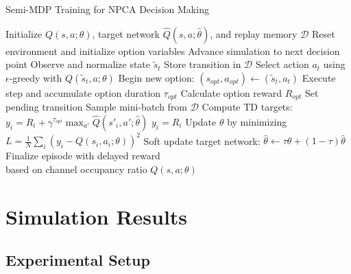 \documentclass[conference]{IEEEtran}
\begin{document}
\begin{algorithm}[htbp]
\caption{Semi-MDP Training for NPCA Decision Making}
\label{alg:semi_mdp_npca}
\begin{algorithmic}[1]
\STATE Initialize $Q(s,a;\theta)$, target network $\hat{Q}(s,a;\hat{\theta})$, and replay memory $\mathcal{D}$
    \STATE Reset environment and initialize option variables
        \STATE Advance simulation to next decision point
            \STATE Observe and normalize state $\tilde{s}_t$ 
                \STATE Store transition in $\mathcal{D}$
            \ENDIF
            \STATE Select action $a_t$ using $\epsilon$-greedy with $Q(\tilde{s}_t, a; \theta)$
            \STATE Begin new option: $(s_{opt}, a_{opt}) \leftarrow (\tilde{s}_t, a_t)$
        \ENDIF
        \STATE Execute step and accumulate option duration $\tau_{opt}$
            \STATE Calculate option reward $R_{opt}$
            \STATE Set pending transition
        \ENDIF
            \STATE Sample mini-batch from $\mathcal{D}$
            \STATE Compute TD targets: \\ 
                    \STATE $y_i = R_i + \gamma^{\tau_{opt}} \max_{a'} \hat{Q}(s'_i, a'; \hat{\theta})$
                \ELSE
                    \STATE $y_i = R_i$
                \ENDIF
            \STATE Update $\theta$ by minimizing \\ 
            \hspace*{\algorithmicindent} $L = \frac{1}{N} \sum_i (y_i - Q(s_i, a_i; \theta))^2$
            \STATE Soft update target network: $\hat{\theta} \leftarrow \tau \theta + (1-\tau) \hat{\theta}$
        \ENDIF
    \ENDFOR
    \STATE Finalize episode with delayed reward \\ 
    \hspace*{\algorithmicindent} based on channel occupancy ratio
\ENDFOR
\RETURN $Q(s,a;\theta)$
\end{algorithmic}
\end{algorithm}

\section{Simulation Results}

\subsection{Experimental Setup}
\end{document}
